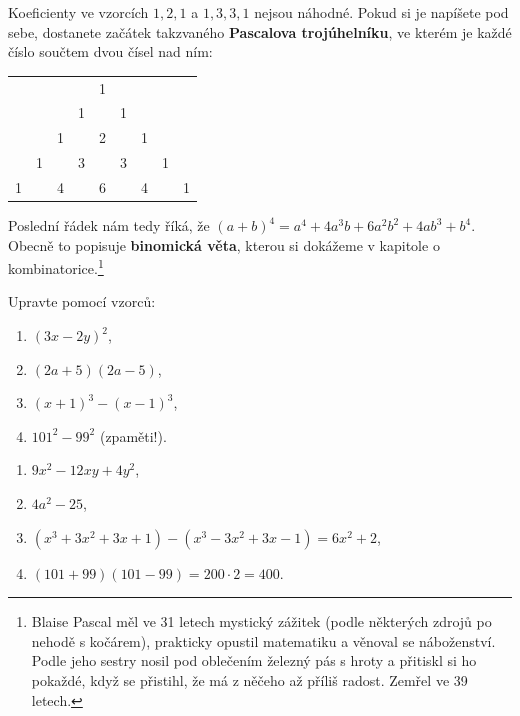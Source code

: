 \begin{note}
  Koeficienty ve vzorcích $1, 2, 1$ a $1, 3, 3, 1$ nejsou náhodné. Pokud si je napíšete pod sebe, dostanete začátek takzvaného \textbf{Pascalova trojúhelníku}, ve kterém je každé číslo součtem dvou čísel nad ním:
  \begin{center}
    \begin{tabular}{ccccccccc}
      &&&& 1 &&&& \\
      &&& 1 && 1 &&& \\
      && 1 && 2 && 1 && \\
      & 1 && 3 && 3 && 1 & \\
      1 && 4 && 6 && 4 && 1
    \end{tabular}
  \end{center}
  Poslední řádek nám tedy říká, že ${(a + b)}^4 = a^4 + 4a^3b + 6a^2b^2 + 4ab^3 + b^4$. Obecně to popisuje \textbf{binomická věta}, kterou si dokážeme v kapitole o kombinatorice.\footnote{Blaise Pascal měl ve 31 letech mystický zážitek (podle některých zdrojů po nehodě s kočárem), prakticky opustil matematiku a věnoval se náboženství. Podle jeho sestry nosil pod oblečením železný pás s hroty a přitiskl si ho pokaždé, když se přistihl, že má z něčeho až příliš radost. Zemřel ve 39 letech.}
\end{note}

\begin{problem}
  Upravte pomocí vzorců:
  \begin{enumerate}[label=(\alph*)]
    \item ${(3x - 2y)}^2$,
    \item $(2a + 5)(2a - 5)$,
    \item ${(x + 1)}^3 - {(x - 1)}^3$,
    \item $101^2 - 99^2$ (zpaměti!).
  \end{enumerate}
\end{problem}

\begin{solution}
  \begin{enumerate}[label=(\alph*)]
    \item $9x^2 - 12xy + 4y^2$,
    \item $4a^2 - 25$,
    \item $(x^3 + 3x^2 + 3x + 1) - (x^3 - 3x^2 + 3x - 1) = 6x^2 + 2$,
    \item $(101 + 99)(101 - 99) = 200\cdot 2 = 400$.
  \end{enumerate}
\end{solution}

